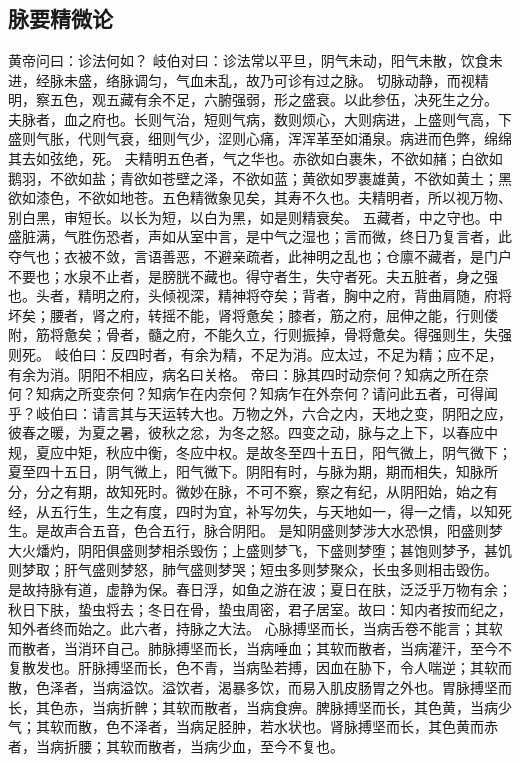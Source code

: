 \documentclass[a4paper,12pt,UTF8,twoside]{ctexbook}
\begin{document}
\part{}
\chapter{脉要精微论}
黄帝问曰：诊法何如？
岐伯对曰：诊法常以平旦，阴气未动，阳气未散，饮食未进，经脉未盛，络脉调匀，气血未乱，故乃可诊有过之脉。
切脉动静，而视精明，察五色，观五藏有余不足，六腑强弱，形之盛衰。以此参伍，决死生之分。
夫脉者，血之府也。长则气治，短则气病，数则烦心，大则病进，上盛则气高，下盛则气胀，代则气衰，细则气少，涩则心痛，浑浑革至如涌泉。病进而色弊，绵绵其去如弦绝，死。
夫精明五色者，气之华也。赤欲如白裹朱，不欲如赭；白欲如鹅羽，不欲如盐；青欲如苍壁之泽，不欲如蓝；黄欲如罗裹雄黄，不欲如黄土；黑欲如漆色，不欲如地苍。五色精微象见矣，其寿不久也。夫精明者，所以视万物、别白黑，审短长。以长为短，以白为黑，如是则精衰矣。
五藏者，中之守也。中盛脏满，气胜伤恐者，声如从室中言，是中气之湿也；言而微，终日乃复言者，此夺气也；衣被不敛，言语善恶，不避亲疏者，此神明之乱也；仓廪不藏者，是门户不要也；水泉不止者，是膀胱不藏也。得守者生，失守者死。夫五脏者，身之强也。头者，精明之府，头倾视深，精神将夺矣；背者，胸中之府，背曲肩随，府将坏矣；腰者，肾之府，转摇不能，肾将惫矣；膝者，筋之府，屈伸之能，行则偻附，筋将惫矣；骨者，髓之府，不能久立，行则振掉，骨将惫矣。得强则生，失强则死。
岐伯曰：反四时者，有余为精，不足为消。应太过，不足为精；应不足，有余为消。阴阳不相应，病名曰关格。
帝曰：脉其四时动奈何？知病之所在奈何？知病之所变奈何？知病乍在内奈何？知病乍在外奈何？请问此五者，可得闻乎？岐伯曰：请言其与天运转大也。万物之外，六合之内，天地之变，阴阳之应，彼春之暖，为夏之暑，彼秋之忿，为冬之怒。四变之动，脉与之上下，以春应中规，夏应中矩，秋应中衡，冬应中权。是故冬至四十五日，阳气微上，阴气微下；夏至四十五日，阴气微上，阳气微下。阴阳有时，与脉为期，期而相失，知脉所分，分之有期，故知死时。微妙在脉，不可不察，察之有纪，从阴阳始，始之有经，从五行生，生之有度，四时为宜，补写勿失，与天地如一，得一之情，以知死生。是故声合五音，色合五行，脉合阴阳。
是知阴盛则梦涉大水恐惧，阳盛则梦大火燔灼，阴阳俱盛则梦相杀毁伤；上盛则梦飞，下盛则梦堕；甚饱则梦予，甚饥则梦取；肝气盛则梦怒，肺气盛则梦哭；短虫多则梦聚众，长虫多则相击毁伤。
是故持脉有道，虚静为保。春日浮，如鱼之游在波；夏日在肤，泛泛乎万物有余；秋日下肤，蛰虫将去；冬日在骨，蛰虫周密，君子居室。故曰：知内者按而纪之，知外者终而始之。此六者，持脉之大法。
心脉搏坚而长，当病舌卷不能言；其软而散者，当消环自己。肺脉搏坚而长，当病唾血；其软而散者，当病灌汗，至今不复散发也。肝脉搏坚而长，色不青，当病坠若搏，因血在胁下，令人喘逆；其软而散，色泽者，当病溢饮。溢饮者，渴暴多饮，而易入肌皮肠胃之外也。胃脉搏坚而长，其色赤，当病折髀；其软而散者，当病食痹。脾脉搏坚而长，其色黄，当病少气；其软而散，色不泽者，当病足胫肿，若水状也。肾脉搏坚而长，其色黄而赤者，当病折腰；其软而散者，当病少血，至今不复也。
\end{document}
